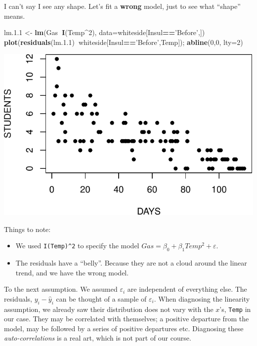 \documentclass[]{book}
\newenvironment{Shaded}{\begin{snugshade}}{\end{snugshade}}
\newcommand{\KeywordTok}[1]{\textcolor[rgb]{0.13,0.29,0.53}{\textbf{#1}}}
\newcommand{\DataTypeTok}[1]{\textcolor[rgb]{0.13,0.29,0.53}{#1}}
\newcommand{\DecValTok}[1]{\textcolor[rgb]{0.00,0.00,0.81}{#1}}
\newcommand{\FloatTok}[1]{\textcolor[rgb]{0.00,0.00,0.81}{#1}}
\newcommand{\StringTok}[1]{\textcolor[rgb]{0.31,0.60,0.02}{#1}}
\newcommand{\OperatorTok}[1]{\textcolor[rgb]{0.81,0.36,0.00}{\textbf{#1}}}
\newcommand{\NormalTok}[1]{#1}
\providecommand{\tightlist}{%
  \setlength{\itemsep}{0pt}\setlength{\parskip}{0pt}}
\theoremstyle{definition}
\theoremstyle{definition}
\theoremstyle{definition}
\theoremstyle{remark}
\begin{document}
I can't say I see any shape. Let's fit a \textbf{wrong} model, just to
see what ``shape'' means.

\begin{Shaded}
\begin{Highlighting}[]
\NormalTok{lm.}\FloatTok{1.1}\NormalTok{ <-}\StringTok{ }\KeywordTok{lm}\NormalTok{(Gas}\OperatorTok{~}\KeywordTok{I}\NormalTok{(Temp}\OperatorTok{^}\DecValTok{2}\NormalTok{), }\DataTypeTok{data=}\NormalTok{whiteside[Insul}\OperatorTok{==}\StringTok{'Before'}\NormalTok{,])}
\KeywordTok{plot}\NormalTok{(}\KeywordTok{residuals}\NormalTok{(lm.}\FloatTok{1.1}\NormalTok{)}\OperatorTok{~}\NormalTok{whiteside[Insul}\OperatorTok{==}\StringTok{'Before'}\NormalTok{,Temp]); }\KeywordTok{abline}\NormalTok{(}\DecValTok{0}\NormalTok{,}\DecValTok{0}\NormalTok{, }\DataTypeTok{lty=}\DecValTok{2}\NormalTok{)}
\end{Highlighting}
\end{Shaded}

\includegraphics[width=0.5\linewidth]{Rcourse_files/figure-latex/unnamed-chunk-144-1}

Things to note:

\begin{itemize}
\tightlist
\item
  We used \texttt{I(Temp)\^{}2} to specify the model
  \(Gas=\beta_0 + \beta_1 Temp^2+ \varepsilon\).
\item
  The residuals have a ``belly''. Because they are not a cloud around
  the linear trend, and we have the wrong model.
\end{itemize}

To the next assumption. We assumed \(\varepsilon_i\) are independent of
everything else. The residuals, \(y_i-\hat y_i\) can be thought of a
sample of \(\varepsilon_i\). When diagnosing the linearity assumption,
we already saw their distribution does not vary with the \(x\)'s,
\texttt{Temp} in our case. They may be correlated with themselves; a
positive departure from the model, may be followed by a series of
positive departures etc. Diagnosing these \emph{auto-correlations} is a
real art, which is not part of our course.
\end{document}
